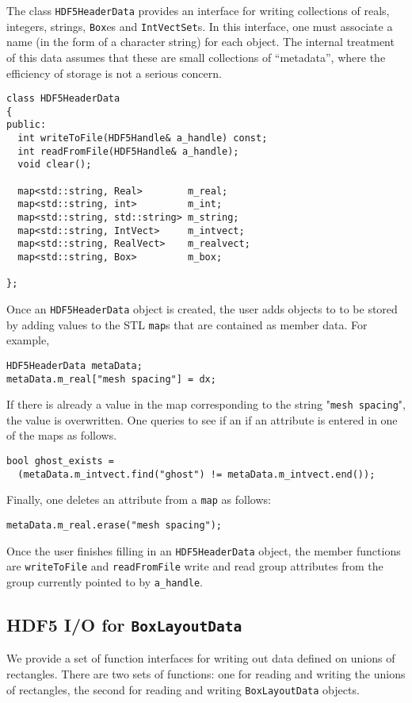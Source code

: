 The class 
{\tt HDF5HeaderData} provides an interface for writing collections
of reals, integers, strings, {\tt Box}es and {\tt IntVectSet}s. 
In this interface, one must associate a name (in the form of a
character string) for each object. The internal treatment of this data
assumes that these are small collections of 
``metadata'', where the efficiency of storage is not a serious concern.
\begin{verbatim}
class HDF5HeaderData
{
public:
  int writeToFile(HDF5Handle& a_handle) const;
  int readFromFile(HDF5Handle& a_handle);
  void clear();

  map<std::string, Real>        m_real;
  map<std::string, int>         m_int;
  map<std::string, std::string> m_string;
  map<std::string, IntVect>     m_intvect;
  map<std::string, RealVect>    m_realvect;
  map<std::string, Box>         m_box;

};

\end{verbatim}
Once an {\tt HDF5HeaderData} object is created, the user adds objects to
to be stored by adding values to the STL {\tt map}s that are contained as
member data. For example,
\begin{verbatim}
HDF5HeaderData metaData;
metaData.m_real["mesh spacing"] = dx;
\end{verbatim}
If there is already a value in the map corresponding to the string 
"{\tt mesh spacing}", the value is overwritten. 
One queries to see if an if an attribute is entered in one of the maps
as follows.
\begin{verbatim}
bool ghost_exists = 
  (metaData.m_intvect.find("ghost") != metaData.m_intvect.end());
\end{verbatim}
Finally, one deletes an attribute from a {\tt map} as follows:
\begin{verbatim}
metaData.m_real.erase("mesh spacing");
\end{verbatim}

Once the user finishes filling in an {\tt HDF5HeaderData} object, the 
member functions are 
\verb/writeToFile/ and \verb/readFromFile/ write and read group attributes
from the group currently pointed to by {\tt a\_handle}.


\subsection{HDF5 I/O for {\tt BoxLayoutData}}

We provide a set of function interfaces for writing out 
data defined on unions of rectangles. There are two sets of functions: 
one for reading and writing the unions of rectangles, the second 
for reading and writing {\tt BoxLayoutData} objects. 

